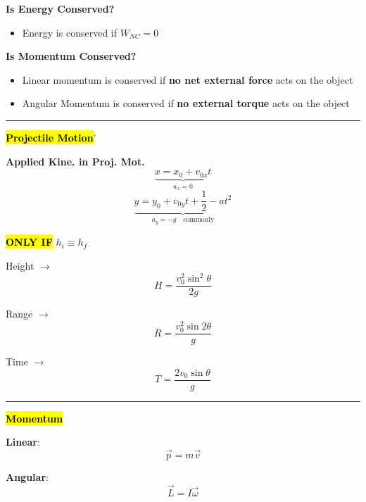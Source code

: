 \documentclass[	DIV=calc,%
							paper=a4,%
							fontsize=11pt,%
							twocolumn]{scrartcl} %
\newcommand{\hformbar}[1]{\vspace{5pt}\hrule\vspace{10pt}} %
\newcommand{\formdesc}[1]{\noindent\textbf{#1}}
\begin{document}
\textbf{Is Energy Conserved?}
\begin{itemize}
    \item Energy is conserved if \textbf{$W_{NC}=0$}
\end{itemize}

\textbf{Is Momentum Conserved?}
\begin{itemize}
    \item Linear momentum is conserved if \textbf{no net external force} acts on the object
    \item Angular Momentum is conserved if \textbf{no external torque }acts on the object
\end{itemize}
\hformbar{}

\formdesc{\hl{Projectile Motion}}'

\textbf{Applied Kine. in Proj. Mot.}
\begin{equation}
    \underbrace{x=x_0+v_{0x}t}_{a_x=0}
\end{equation}
\begin{equation}
    \underbrace{y=y_0+v_{0y}t+\frac{1}{2}-at^2}_{a_y=-g\quad\text{commonly}}
\end{equation}

\textbf{\hl{ONLY IF}} $h_i\equiv h_f$

Height $\rightarrow$\begin{equation}
    H = \frac{v_0^2\sin^2\theta}{2g}
\end{equation}

Range $\rightarrow$\begin{equation}
     R = \frac{v_0^2\sin{2\theta}}{g}
\end{equation}

Time $\rightarrow$\begin{equation}
    T = \frac{2v_0\sin\theta}{g}
\end{equation}
\hformbar{}

\formdesc{\hl{Momentum}}

\textbf{Linear}:
\begin{equation}
    \vec p = m\vec v
\end{equation}

\textbf{Angular}:
\begin{equation}
    \vec L = I\vec\omega
\end{equation}
\end{document}
